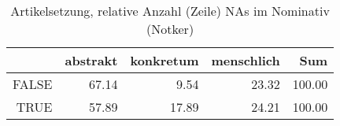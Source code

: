 \begin{table}[ht]
\centering
\begin{tabular}{rrrrr}
  \hline
 & abstrakt & konkretum & menschlich & Sum \\ 
  \hline
FALSE & 67.14 & 9.54 & 23.32 & 100.00 \\ 
  TRUE & 57.89 & 17.89 & 24.21 & 100.00 \\ 
   \hline
\end{tabular}
\caption{Artikelsetzung, relative Anzahl (Zeile) NAs im Nominativ (Notker)} 
\end{table}
